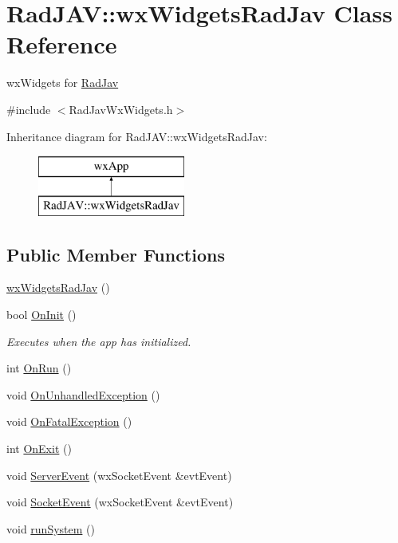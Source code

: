 \hypertarget{class_rad_j_a_v_1_1wx_widgets_rad_jav}{}\section{Rad\+J\+AV\+:\+:wx\+Widgets\+Rad\+Jav Class Reference}
\label{class_rad_j_a_v_1_1wx_widgets_rad_jav}


wx\+Widgets for \hyperlink{class_rad_j_a_v_1_1_rad_jav}{Rad\+Jav}  




{\ttfamily \#include $<$Rad\+Jav\+Wx\+Widgets.\+h$>$}

Inheritance diagram for Rad\+J\+AV\+:\+:wx\+Widgets\+Rad\+Jav\+:\begin{figure}[H]
\begin{center}
\leavevmode
\includegraphics[height=2.000000cm]{class_rad_j_a_v_1_1wx_widgets_rad_jav}
\end{center}
\end{figure}
\subsection*{Public Member Functions}
\begin{DoxyCompactItemize}
\item 
\hyperlink{class_rad_j_a_v_1_1wx_widgets_rad_jav_a81ff56b4ae9e9d4c50155151eadc35b7}{wx\+Widgets\+Rad\+Jav} ()
\item 
bool \hyperlink{class_rad_j_a_v_1_1wx_widgets_rad_jav_a9e8269312d40feafc94718a0b2912de8}{On\+Init} ()
\begin{DoxyCompactList}\small\item\em Executes when the app has initialized. \end{DoxyCompactList}\item 
int \hyperlink{class_rad_j_a_v_1_1wx_widgets_rad_jav_a37c46a1705f10f3bd0a79fa148361400}{On\+Run} ()
\item 
void \hyperlink{class_rad_j_a_v_1_1wx_widgets_rad_jav_a8fc014edbdcd68cc1ad849fe148f9871}{On\+Unhandled\+Exception} ()
\item 
void \hyperlink{class_rad_j_a_v_1_1wx_widgets_rad_jav_ad73346ef2ddf9aa8855bf07c349519cb}{On\+Fatal\+Exception} ()
\item 
int \hyperlink{class_rad_j_a_v_1_1wx_widgets_rad_jav_add7d79813e2e017382a8a9da399e91ce}{On\+Exit} ()
\item 
void \hyperlink{class_rad_j_a_v_1_1wx_widgets_rad_jav_ad96e50771b485673fbefaf9bb102441d}{Server\+Event} (wx\+Socket\+Event \&evt\+Event)
\item 
void \hyperlink{class_rad_j_a_v_1_1wx_widgets_rad_jav_a2bf79b1939cb6f8239e6a5144701fa6d}{Socket\+Event} (wx\+Socket\+Event \&evt\+Event)
\item 
void \hyperlink{class_rad_j_a_v_1_1wx_widgets_rad_jav_aefe213408c6f7fb404d5a8a270e9b7d7}{run\+System} ()
\end{DoxyCompactItemize}
